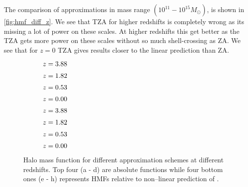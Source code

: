 The comparison of approximations in mass range $(10^{11}-10^{15}M_\odot)$, is shown in \autoref{fig:hmf_diff_z}. We see that TZA for higher redshifts is completely wrong as its missing a lot of power on these scales. At higher redshifts this get better as the TZA gets more power on these scales without so much shell-crossing as ZA. We see that for $z=0$ TZA gives results closer to the linear prediction than ZA.
\begin{figure*}[p]
	\centering
	\begin{subfigure}{1.0\textwidth}
	\end{subfigure}
	\begin{subfigure}{0.5\textwidth}
		\caption{$z=3.88$}
	\end{subfigure}%
	\begin{subfigure}{0.5\textwidth}
		\caption{$z=1.82$}
	\end{subfigure}
	\begin{subfigure}{0.5\textwidth}
		\caption{$z=0.53$}
	\end{subfigure}%
	\begin{subfigure}{0.5\textwidth}
		\caption{$z=0.00$}
	\end{subfigure}
	\begin{subfigure}{0.5\textwidth}
		\caption{$z=3.88$}
	\end{subfigure}%
	\begin{subfigure}{0.5\textwidth}
		\caption{$z=1.82$}
	\end{subfigure}
	\begin{subfigure}{0.5\textwidth}
		\caption{$z=0.53$}
	\end{subfigure}%
	\begin{subfigure}{0.5\textwidth}
		\caption{$z=0.00$}
	\end{subfigure}
	\caption{Halo mass function for different approximation schemes at different redshifts. Top four (a - d) are absolute functions while four bottom ones (e - h) represents HMFs relative to non--linear prediction of \LCDM.}
	\label{fig:hmf_diff_z}
\end{figure*}

